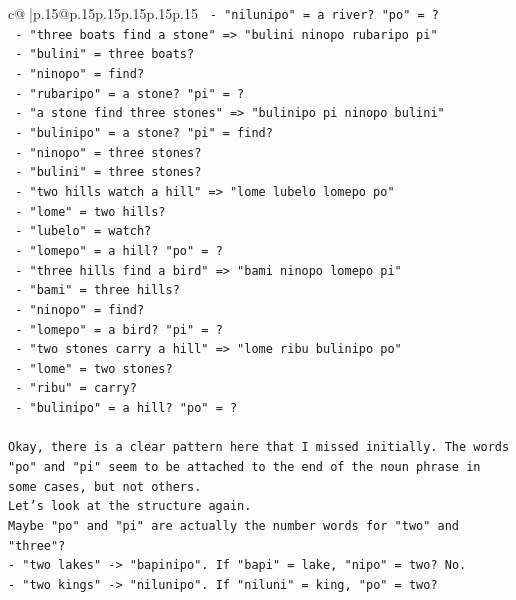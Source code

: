 \documentclass{article}
\begin{document}
{\begin{supertabular}{c@{$\;$}|p{.15\linewidth}@{}p{.15\linewidth}p{.15\linewidth}p{.15\linewidth}p{.15\linewidth}p{.15\linewidth}}
{{{\texttt{       {-} "nilunipo" = a river? "po" = ?} \\
\texttt{     {-} "three boats find a stone" => "bulini ninopo rubaripo pi"} \\
\texttt{       {-} "bulini" = three boats?} \\
\texttt{       {-} "ninopo" = find?} \\
\texttt{       {-} "rubaripo" = a stone? "pi" = ?} \\
\texttt{     {-} "a stone find three stones" => "bulinipo pi ninopo bulini"} \\
\texttt{       {-} "bulinipo" = a stone? "pi" = find?} \\
\texttt{       {-} "ninopo" = three stones?} \\
\texttt{       {-} "bulini" = three stones?} \\
\texttt{     {-} "two hills watch a hill" => "lome lubelo lomepo po"} \\
\texttt{       {-} "lome" = two hills?} \\
\texttt{       {-} "lubelo" = watch?} \\
\texttt{       {-} "lomepo" = a hill? "po" = ?} \\
\texttt{     {-} "three hills find a bird" => "bami ninopo lomepo pi"} \\
\texttt{       {-} "bami" = three hills?} \\
\texttt{       {-} "ninopo" = find?} \\
\texttt{       {-} "lomepo" = a bird? "pi" = ?} \\
\texttt{     {-} "two stones carry a hill" => "lome ribu bulinipo po"} \\
\texttt{       {-} "lome" = two stones?} \\
\texttt{       {-} "ribu" = carry?} \\
\texttt{       {-} "bulinipo" = a hill? "po" = ?} \\
\\ 
\texttt{Okay, there is a clear pattern here that I missed initially. The words "po" and "pi" seem to be attached to the end of the noun phrase in some cases, but not others.} \\
\texttt{Let's look at the structure again.} \\
\texttt{Maybe "po" and "pi" are actually the number words for "two" and "three"?} \\
\texttt{{-} "two lakes" {-}> "bapinipo". If "bapi" = lake, "nipo" = two? No.} \\
\texttt{{-} "two kings" {-}> "nilunipo". If "niluni" = king, "po" = two?} \\
}}}
\end{supertabular}}
\end{document}
